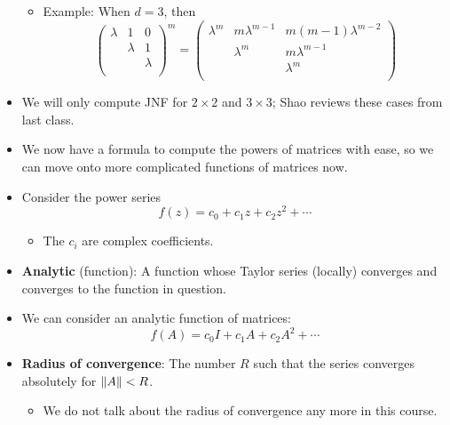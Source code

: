 \documentclass[../notes.tex]{subfiles}
\begin{document}
\begin{itemize}
\begin{itemize}
\begin{equation*}
        \end{equation*}
        \item Example: When $d=3$, then
        \begin{equation*}
            \begin{pmatrix}
                \lambda & 1 & 0\\
                 & \lambda & 1\\
                 &  & \lambda\\
            \end{pmatrix}^m
            =
            \begin{pmatrix}
                \lambda^m & m\lambda^{m-1} & m(m-1)\lambda^{m-2}\\
                 & \lambda^m & m\lambda^{m-1}\\
                 &  & \lambda^m\\
            \end{pmatrix}
        \end{equation*}
    \end{itemize}
    \item We will only compute JNF for $2\times 2$ and $3\times 3$; Shao reviews these cases from last class.
    \item We now have a formula to compute the powers of matrices with ease, so we can move onto more complicated functions of matrices now.
    \item Consider the power series
    \begin{equation*}
        f(z) = c_0+c_1z+c_2z^2+\cdots
    \end{equation*}
    \begin{itemize}
        \item The $c_i$ are complex coefficients.
    \end{itemize}
    \item \textbf{Analytic} (function): A function whose Taylor series (locally) converges and converges to the function in question.
    \item We can consider an analytic function of matrices:
    \begin{equation*}
        f(A) = c_0I+c_1A+c_2A^2+\cdots
    \end{equation*}
    \item \textbf{Radius of convergence}: The number $R$ such that the series converges absolutely for $\norm{A}<R$.
    \begin{itemize}
        \item We do not talk about the radius of convergence any more in this course.

\end{itemize}
\end{itemize}
\end{document}
